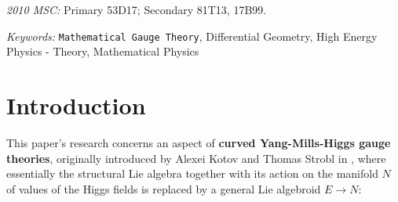 \documentclass[a4paper,oneside,11pt]{scrartcl} %
\theoremstyle{plain}
\theoremstyle{remark}
\theoremstyle{definition}
\begin{document}
\begin{titlepage}
\begin{center}
\begin{abstract}
{	%
}
 \end{abstract}
\end{center}

\textit{2010 MSC:} Primary 53D17; Secondary 81T13, 17B99.

\textit{Keywords:} \texttt{Mathematical Gauge Theory}, Differential Geometry, High Energy Physics - Theory, Mathematical Physics

\end{titlepage}




\tableofcontents





\renewcommand{\thefootnote}{\arabic{footnote}}
%
\setlength{\parindent}{12 pt}




\section{Introduction}

This paper's research concerns an aspect of \textbf{curved Yang-Mills-Higgs gauge theories}, originally introduced by Alexei Kotov and Thomas Strobl in \cite{CurvedYMH}, where essentially the structural Lie algebra together with its action on the manifold $N$ of values of the Higgs fields is replaced by a general Lie algebroid $E \to N$:
\end{document}
